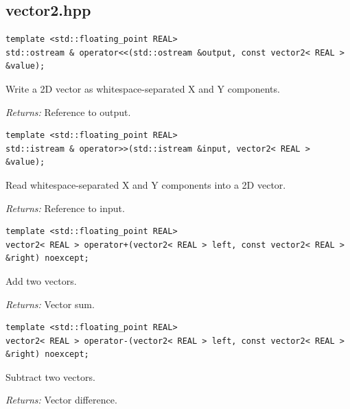 \subsection{vector2.hpp}
\par\noindent\begin{minipage}{\linewidth}
\begin{lstlisting}[style=apireference]
template <std::floating_point REAL>
std::ostream & operator<<(std::ostream &output, const vector2< REAL > &value);
\end{lstlisting}
{\footnotesize Write a 2D vector as whitespace-separated X and Y components.\par}
{\footnotesize\textit{Returns:} Reference to output.\par}
\end{minipage}\par\vspace{1pt}
\par\noindent\begin{minipage}{\linewidth}
\begin{lstlisting}[style=apireference]
template <std::floating_point REAL>
std::istream & operator>>(std::istream &input, vector2< REAL > &value);
\end{lstlisting}
{\footnotesize Read whitespace-separated X and Y components into a 2D vector.\par}
{\footnotesize\textit{Returns:} Reference to input.\par}
\end{minipage}\par\vspace{1pt}
\par\noindent\begin{minipage}{\linewidth}
\begin{lstlisting}[style=apireference]
template <std::floating_point REAL>
vector2< REAL > operator+(vector2< REAL > left, const vector2< REAL > &right) noexcept;
\end{lstlisting}
{\footnotesize Add two vectors.\par}
{\footnotesize\textit{Returns:} Vector sum.\par}
\end{minipage}\par\vspace{1pt}
\par\noindent\begin{minipage}{\linewidth}
\begin{lstlisting}[style=apireference]
template <std::floating_point REAL>
vector2< REAL > operator-(vector2< REAL > left, const vector2< REAL > &right) noexcept;
\end{lstlisting}
{\footnotesize Subtract two vectors.\par}
{\footnotesize\textit{Returns:} Vector difference.\par}
\end{minipage}\par\vspace{1pt}
